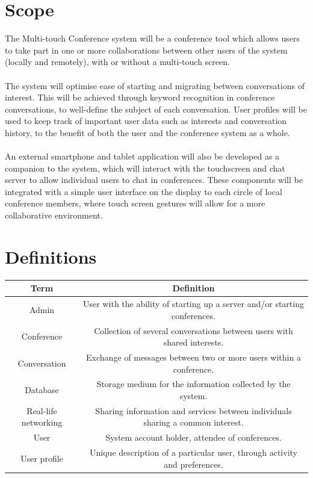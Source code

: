 \documentclass[12p, a4paper, onecolumn]{report}
\begin{document}
\section{Scope}

The Multi-touch Conference system will be a conference tool which allows users to take part in one or more collaborations between other users of the system (locally and remotely), with or without a multi-touch screen. \\ \\
The system will optimise ease of starting and migrating between conversations of interest. This will be achieved through keyword recognition in conference conversations, to well-define the subject of each conversation. User profiles will be used to keep track of important user data such as interests and conversation history, to the benefit of both the user and the conference system as a whole. \\ \\
An external smartphone and tablet application will also be developed as a companion to the system, which will interact with the touchscreen and chat server to allow individual users to chat in conferences. These components will be integrated with a simple user interface on the display to each circle of local conference members, where touch screen gestures will allow for a more collaborative environment.

\section{Definitions}

\begin{center}
\begin{tabular}[c]{| c | c |}
\hline
\textbf{Term} & \textbf{Definition} \\
\hline
Admin & User with the ability of starting up a server and/or starting conferences. \\
\hline
Conference & Collection of several conversations between users with shared interests. \\
\hline
Conversation & Exchange of messages between two or more users within a conference. \\
\hline
Database & Storage medium for the information collected by the system. \\
\hline
Real-life networking & Sharing information and services between individuals sharing a common interest. \\
\hline
User & System account holder, attendee of conferences. \\
\hline
User profile & Unique description of a particular user, through activity and preferences. \\
\hline
\end{tabular}
\end{center}
\end{document}
